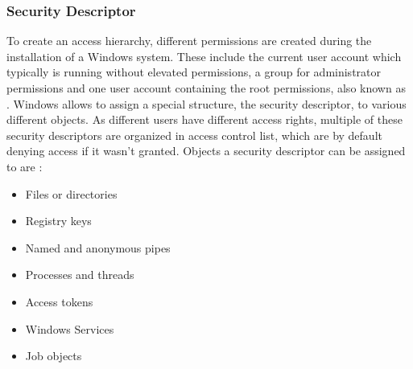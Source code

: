 \subsubsection{Security Descriptor}
\label{sec:sd}
To create an access hierarchy, different permissions are created during the installation of a Windows system. These include the current user account which typically is running without elevated permissions, a group for administrator permissions and one user account containing the root permissions, also known as . Windows allows to assign a special structure, the security descriptor, to various different objects. As different users have different access rights, multiple of these security descriptors are organized in access control list, which are by default denying access if it wasn't granted. Objects a security descriptor can be assigned to are \cite{msdn_sd}:
\begin{itemize}
\item Files or directories
\item Registry keys
\item Named and anonymous pipes
\item Processes and threads
\item Access tokens
\item Windows Services
\item Job objects
\end{itemize}